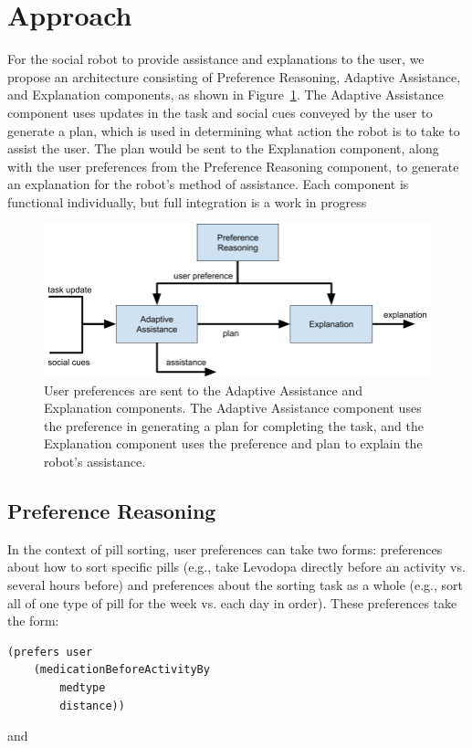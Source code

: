 \documentclass[letterpaper]{article} %
\begin{document}

\section{Approach}


For the social robot to provide assistance and explanations to the user, we propose an
architecture consisting of Preference Reasoning, Adaptive Assistance, and Explanation
components, as shown in Figure~\ref{fig:arch}.  The Adaptive Assistance component uses updates in the task and social cues conveyed by the user to generate a plan, which is used in determining what action the robot is to take to assist the user.  The plan would be sent to the Explanation component, along with the user preferences from the Preference Reasoning component, to generate an explanation for the robot's method of assistance. Each component is functional individually, but full integration is a work in progress

\begin{figure}[h]
\centering
\includegraphics[width=1.0\columnwidth]{architecture.png} 
\caption{User preferences are sent to the Adaptive Assistance and Explanation components.  The Adaptive Assistance component uses the preference in generating a plan for completing the task, and the Explanation component uses the preference and plan to explain the robot's assistance.}
\label{fig:arch}
\end{figure}

\subsection{Preference Reasoning}
In the context of pill sorting, user preferences can take two forms: preferences about how to sort specific pills (e.g., take Levodopa directly before an activity vs. several hours before) and preferences about the sorting task as a whole (e.g., sort all of one type of pill for the week vs. each day in order). These preferences take the form:
 \small{
 \begin{verbatim}
(prefers user 
    (medicationBeforeActivityBy 
        medtype
        distance))
 \end{verbatim}}
 \noindent 
 and
 
\end{document}
